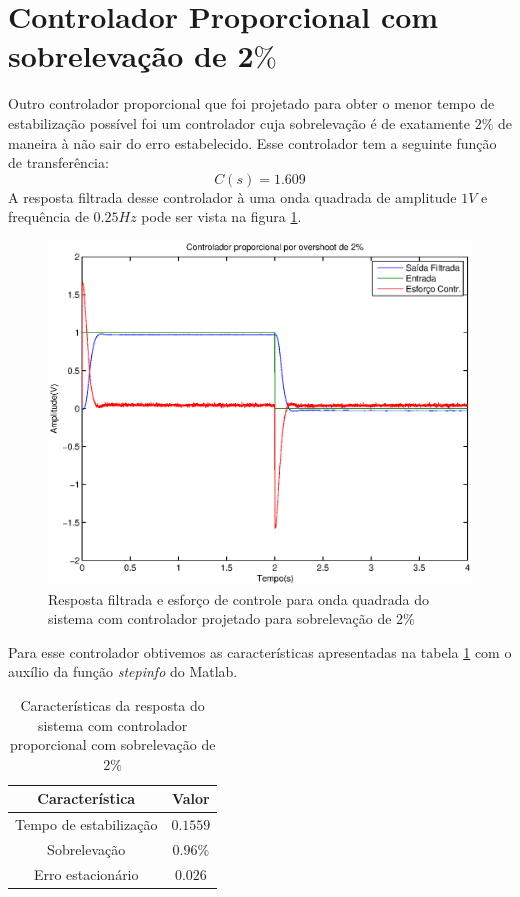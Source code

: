 \documentclass{article}
\begin{document}
  \section{Controlador Proporcional com sobrelevação de 2$\%$}
  Outro controlador proporcional que foi projetado para obter o menor tempo de estabilização possível foi um controlador cuja sobrelevação é de exatamente $2\%$ de maneira à não sair do erro estabelecido. Esse controlador tem a seguinte função de transferência:
  \begin{equation}
  \label{eq:pidcv}
  C(s) = 1.609
  \end{equation}
  A resposta filtrada desse controlador à uma onda quadrada de amplitude $1 V$ e frequência de $0.25 Hz$ pode ser vista na figura \ref{fig:yupidv}.
  \begin{figure}[H]
  	\centering
  	\includegraphics[width=0.8\linewidth]{yupidv}
  	\caption{Resposta filtrada e esforço de controle para onda quadrada do sistema com controlador projetado para sobrelevação de $2\%$}
  	\label{fig:yupidv}
  \end{figure}
  Para esse controlador obtivemos as características apresentadas na tabela \ref{tab:pidv} com o auxílio da função \textit{stepinfo} do Matlab.
  \begin{table}[H]
  	\centering
  	\caption{Características da resposta do sistema com controlador proporcional com sobrelevação de $2\%$}
  	\label{tab:pidv}
  	\begin{tabular}{|c|c|}
  		\hline Característica & Valor \\ 
  		\hline Tempo de estabilização & $0.1559$\\
  		\hline Sobrelevação & $0.96\%$\\ 
  		\hline Erro estacionário & $0.026$\\ 
  		\hline 
  	\end{tabular} 
  \end{table}
  
\end{document}
